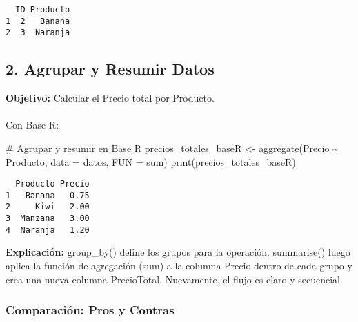 \documentclass[
  letterpaper,
  DIV=11,
  numbers=noendperiod]{scrartcl}
\makeatletter
\let\oldparagraph\paragraph
\renewcommand{\paragraph}{
    \@ifstar
      \xxxParagraphStar
      \xxxParagraphNoStar
  }
\newcommand{\xxxParagraphStar}[1]{\oldparagraph*{#1}\mbox{}}
\newcommand{\xxxParagraphNoStar}[1]{\oldparagraph{#1}\mbox{}}
\newenvironment{Shaded}{\begin{snugshade}}{\end{snugshade}}
\newcommand{\AttributeTok}[1]{\textcolor[rgb]{0.40,0.45,0.13}{#1}}
\newcommand{\CommentTok}[1]{\textcolor[rgb]{0.37,0.37,0.37}{#1}}
\newcommand{\FunctionTok}[1]{\textcolor[rgb]{0.28,0.35,0.67}{#1}}
\newcommand{\NormalTok}[1]{\textcolor[rgb]{0.00,0.23,0.31}{#1}}
\newcommand{\OtherTok}[1]{\textcolor[rgb]{0.00,0.23,0.31}{#1}}
\newcommand{\SpecialCharTok}[1]{\textcolor[rgb]{0.37,0.37,0.37}{#1}}
\makeatother
\begin{document}
\begin{verbatim}
  ID Producto
1  2   Banana
2  3  Naranja
\end{verbatim}

\subsection{2. Agrupar y Resumir Datos}\label{agrupar-y-resumir-datos}

\textbf{Objetivo:} Calcular el Precio total por Producto.

\paragraph{Con Base R:}\label{con-base-r-1}

\begin{Shaded}
\begin{Highlighting}[]
\CommentTok{\# Agrupar y resumir en Base R}
\NormalTok{precios\_totales\_baseR }\OtherTok{\textless{}{-}} \FunctionTok{aggregate}\NormalTok{(Precio }\SpecialCharTok{\textasciitilde{}}\NormalTok{ Producto, }\AttributeTok{data =}\NormalTok{ datos, }\AttributeTok{FUN =}\NormalTok{ sum)}
\FunctionTok{print}\NormalTok{(precios\_totales\_baseR)}
\end{Highlighting}
\end{Shaded}

\begin{verbatim}
  Producto Precio
1   Banana   0.75
2     Kiwi   2.00
3  Manzana   3.00
4  Naranja   1.20
\end{verbatim}

\textbf{Explicación:} group\_by() define los grupos para la operación.
summarise() luego aplica la función de agregación (sum) a la columna
Precio dentro de cada grupo y crea una nueva columna PrecioTotal.
Nuevamente, el flujo es claro y secuencial.

\subsubsection{Comparación: Pros y
Contras}\label{comparaciuxf3n-pros-y-contras}
\end{document}
